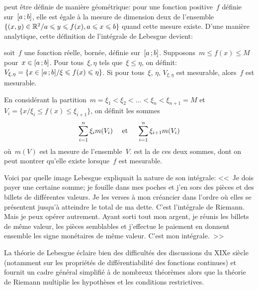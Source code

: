 \begin{histoire}
peut être définie de manière géométrique: pour une fonction
positive~$f$ définie sur~$\mathopen{[}a\,;b\mathclose{]}$, elle est égale à la mesure de dimension deux de l'ensemble
$\{(x,y)\in\mathbb R^2 / a\leqslant y\leqslant f(x), a\leqslant x\leqslant b\}$ quand cette mesure existe.
D'une manière analytique, cette définition de l'intégrale de Lebesgue devient:

\begin{definition}
soit~$f$ une fonction réelle, bornée, définie sur~$\mathopen{[}a\,;b\mathclose{]}$.
Supposons~$m\le f(x)\le M$ pour~$x\in\mathopen{[}a\,;b\mathclose{]}$.
Pour tous~$\xi, \eta$ tels que~$\xi\le\eta$, on définit:
$V_{\xi,\eta}=\{x\in\mathopen{[}a\,;b\mathclose{]}/ \xi\leqslant f(x)\leqslant\eta\}$.
Si pour tous~$\xi$, $\eta$, $V_{\xi,\eta}$ est mesurable, alors~$f$ est mesurable.

En considérant la partition~$m=\xi_1<\xi_2<...<\xi_n<\xi_{n+1}=M$ et
$V_i=\{x/ \xi_i\le f(x)\le\xi_{i+1}\}$, on définit les sommes
\begin{equation} \displaystyle\sum_{i=1}^n\xi_i m(V_i) \quad \text{ et }\quad \displaystyle\sum_{i=1}^n\xi_{i+1} m(V_i) \end{equation}
où~$m(V)$ est la mesure de l'ensemble~$V$.
 est la
 de ces deux sommes, dont on peut montrer qu'elle existe lorsque~$f$ est mesurable.
\end{definition}

\medskip
Voici par quelle image Lebesgue
expliquait la nature de son intégrale: <<~Je
dois payer une certaine somme; je fouille dans mes poches et j'en sors des pièces
et des billets de différentes valeurs. Je les verses à mon créancier dans l'ordre où
elles se présentent jusqu'à atteindre le total de ma dette. C'est l'intégrale de
Riemann.
Mais je peux opérer autrement. Ayant sorti tout mon argent, je réunis
les billets de même valeur, les pièces semblables et j'effectue le paiement en
donnent ensemble les signe monétaires de même valeur. C'est mon intégrale.~>>

\medskip
La théorie de Lebesgue
éclaire bien des difficultés des discussions du
XIXe siècle (notamment sur les propriétés de différentiabilité des fonctions
continues) et fournit un cadre général simplifié à de nombreux théorèmes
alors que la théorie de Riemann
multiplie les hypothèses et les conditions restrictives.


\end{histoire}
